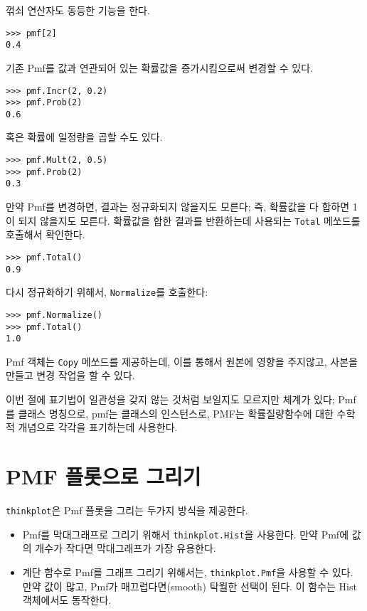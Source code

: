 꺾쇠 연산자도 동등한 기능을 한다.

\begin{verbatim}
>>> pmf[2]
0.4
\end{verbatim}

기존 Pmf를 값과 연관되어 있는 확률값을 증가시킴으로써 변경할 수 있다.
%
\begin{verbatim}
>>> pmf.Incr(2, 0.2)
>>> pmf.Prob(2)
0.6
\end{verbatim}

혹은 확률에 일정량을 곱할 수도 있다.
%
\begin{verbatim}
>>> pmf.Mult(2, 0.5)
>>> pmf.Prob(2)
0.3
\end{verbatim}

만약 Pmf를 변경하면, 결과는 정규화되지 않을지도 모른다; 즉, 확률값을 다 합하면 1이 되지 않을지도 모른다.
확률값을 합한 결과를 반환하는데 사용되는 {\tt Total} 메쏘드를 호출해서 확인한다. 

%
\begin{verbatim}
>>> pmf.Total()
0.9
\end{verbatim}

다시 정규화하기 위해서, {\tt Normalize}를 호출한다:
%
\begin{verbatim}
>>> pmf.Normalize()
>>> pmf.Total()
1.0
\end{verbatim}

Pmf 객체는 {\tt Copy} 메쏘드를 제공하는데, 이를 통해서 원본에 영향을 주지않고, 사본을 만들고 변경 작업을 할 수 있다.

이번 절에 표기법이 일관성을 갖지 않는 것처럼 보일지도 모르지만 체계가 있다;
Pmf를 클래스 명칭으로, pmf는 클래스의 인스턴스로, PMF는 확률질량함수에 대한 수학적 개념으로 각각을 표기하는데 사용한다.

\section{PMF 플롯으로 그리기}

{\tt thinkplot}은 Pmf 플롯을 그리는 두가지 방식을 제공한다.

\begin{itemize}

\item Pmf를 막대그래프로 그리기 위해서 {\tt thinkplot.Hist}을 사용한다.
만약 Pmf에 값의 개수가 작다면 막대그래프가 가장 유용한다.

\item 계단 함수로 Pmf를 그래프 그리기 위해서는, {\tt thinkplot.Pmf}을 사용할 수 있다.
만약 값이 많고, Pmf가 매끄럽다면(smooth) 탁월한 선택이 된다. 이 함수는 Hist 객체에서도 동작한다.

\end{itemize}


